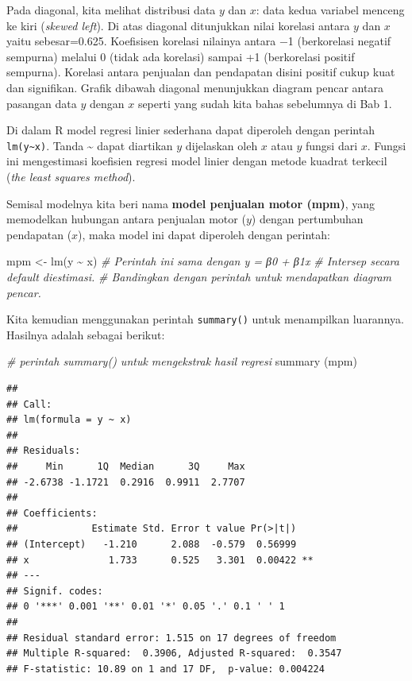 \documentclass[
]{book}
\newenvironment{Shaded}{\begin{snugshade}}{\end{snugshade}}
\newcommand{\CommentTok}[1]{\textcolor[rgb]{0.56,0.35,0.01}{\textit{#1}}}
\newcommand{\FunctionTok}[1]{\textcolor[rgb]{0.00,0.00,0.00}{#1}}
\newcommand{\NormalTok}[1]{#1}
\newcommand{\OtherTok}[1]{\textcolor[rgb]{0.56,0.35,0.01}{#1}}
\newcommand{\SpecialCharTok}[1]{\textcolor[rgb]{0.00,0.00,0.00}{#1}}
\begin{document}
Pada diagonal, kita melihat distribusi data \(y\) dan \(x\): data kedua variabel menceng ke kiri (\emph{skewed left}). Di atas diagonal ditunjukkan nilai korelasi antara \(y\) dan \(x\) yaitu sebesar=0.625. Koefisisen korelasi nilainya antara −1 (berkorelasi negatif sempurna) melalui 0 (tidak ada korelasi) sampai +1 (berkorelasi positif sempurna). Korelasi antara penjualan dan pendapatan disini positif cukup kuat dan signifikan. Grafik dibawah diagonal menunjukkan diagram pencar antara pasangan data \(y\) dengan \(x\) seperti yang sudah kita bahas sebelumnya di Bab 1.

Di dalam R model regresi linier sederhana dapat diperoleh dengan perintah \texttt{lm(y\textasciitilde{}x)}. Tanda \textasciitilde{} dapat diartikan \(y\) dijelaskan oleh \(x\) atau \(y\) fungsi dari \(x\). Fungsi ini mengestimasi koefisien regresi model linier dengan metode kuadrat terkecil (\emph{the least squares method}).

Semisal modelnya kita beri nama \textbf{model penjualan motor (mpm)}, yang memodelkan hubungan antara penjualan motor (\(y\)) dengan pertumbuhan pendapatan (\(x\)), maka model ini dapat diperoleh dengan perintah:

\begin{Shaded}
\begin{Highlighting}[]
\NormalTok{mpm }\OtherTok{\textless{}{-}} \FunctionTok{lm}\NormalTok{(y }\SpecialCharTok{\textasciitilde{}}\NormalTok{ x) }
\CommentTok{\# Perintah ini sama dengan y = β0 + β1x}
\CommentTok{\# Intersep secara default diestimasi. }
\CommentTok{\# Bandingkan dengan perintah untuk mendapatkan diagram pencar. }
\end{Highlighting}
\end{Shaded}

Kita kemudian menggunakan perintah \texttt{summary()} untuk menampilkan luarannya. Hasilnya adalah sebagai berikut:

\begin{Shaded}
\begin{Highlighting}[]
\CommentTok{\# perintah summary() untuk mengekstrak hasil regresi}
\FunctionTok{summary}\NormalTok{ (mpm) }
\end{Highlighting}
\end{Shaded}

\begin{verbatim}
## 
## Call:
## lm(formula = y ~ x)
## 
## Residuals:
##     Min      1Q  Median      3Q     Max 
## -2.6738 -1.1721  0.2916  0.9911  2.7707 
## 
## Coefficients:
##             Estimate Std. Error t value Pr(>|t|)   
## (Intercept)   -1.210      2.088  -0.579  0.56999   
## x              1.733      0.525   3.301  0.00422 **
## ---
## Signif. codes:  
## 0 '***' 0.001 '**' 0.01 '*' 0.05 '.' 0.1 ' ' 1
## 
## Residual standard error: 1.515 on 17 degrees of freedom
## Multiple R-squared:  0.3906, Adjusted R-squared:  0.3547 
## F-statistic: 10.89 on 1 and 17 DF,  p-value: 0.004224
\end{verbatim}
\end{document}
